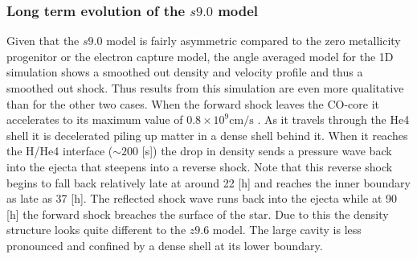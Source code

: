 \documentclass[fleqn,usenatbib]{mnras}
\begin{document}
\subsubsection{Long term evolution of the $s9.0$ model}
Given that the $s9.0$ model is fairly asymmetric compared to the zero metallicity progenitor or the electron capture model, the angle averaged model for the 1D simulation shows a smoothed out density and velocity profile and thus a smoothed out shock. Thus results from this simulation are even more qualitative than for the other two cases.
When the forward shock leaves the CO-core it accelerates to its maximum value of $0.8\times 10^{9}\mathrm{cm/s}$ . As it travels through the He4 shell it is decelerated piling up matter in a dense shell behind it. When it reaches the H/He4 interface ($\sim 200$ [s]) the drop in density sends a pressure wave back into the ejecta that steepens into a reverse shock. Note that this reverse shock begins to fall back relatively late at around 22 [h] and reaches the inner boundary as late as 37 [h]. The reflected shock wave runs back into the ejecta while at 90 [h] the forward shock breaches the surface of the star. Due to this the density structure looks quite different to the $z9.6$ model. The large cavity is less pronounced and confined by a dense shell at its lower boundary. 
\end{document}
